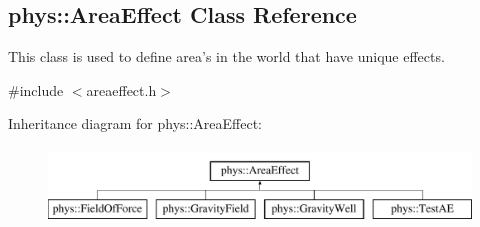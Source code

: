 \hypertarget{classphys_1_1AreaEffect}{
\subsection{phys::AreaEffect Class Reference}
\label{classphys_1_1AreaEffect}
}


This class is used to define area's in the world that have unique effects.  




{\ttfamily \#include $<$areaeffect.h$>$}

Inheritance diagram for phys::AreaEffect:\begin{figure}[H]
\begin{center}
\leavevmode
\includegraphics[height=2.000000cm]{classphys_1_1AreaEffect}
\end{center}
\end{figure}
